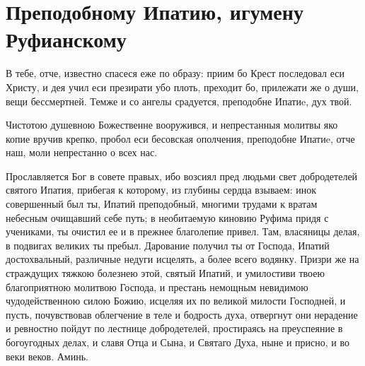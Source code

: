 \section{Преподобному Ипатию, игумену Руфианскому}\begin{mymulticols}


В тебе, отче, известно спасеся еже по образу: приим бо Крест последовал еси Христу, и дея учил еси презирати убо плоть, преходит бо, прилежати же о души, вещи бессмертней. Темже и со ангелы срадуется, преподобне Ипатиe, дух твой.


Чистотою душевною Божественне вооружився, и непрестанныя молитвы яко копие вручив крепко, пробол еси бесовская ополчения, преподобне Ипатиe, отче наш, моли непрестанно о всех нас.


Прославляется Бог в совете правых, ибо возсиял пред людьми свет добродетелей святого Ипатия, прибегая к которому, из глубины сердца взываем: инок совершенный был ты, Ипатий преподобный, многими трудами к вратам небесным очищавший себе путь; в необитаемую киновию Руфима придя с учениками, ты очистил ее и в прежнее благолепие привел. Там, власяницы делая, в подвигах великих ты пребыл. Дарование получил ты от Господа, Ипатий достохвальный, различные недуги исцелять, а более всего водянку. Призри же на страждущих тяжкою болезнею этой, святый Ипатий, и умилостиви твоею благоприятною молитвою Господа, и престань немощным невидимою чудодейственною силою Божию, исцеляя их по великой милости Господней, и пусть, почувствовав облегчение в теле и бодрость духа, отвергнут они нерадение и ревностно пойдут по лестнице добродетелей, простираясь на преуспеяние в богоугодных делах, и славя Отца и Сына, и Святаго Духа, ныне и присно, и во веки веков. Аминь.

\end{mymulticols}

\mychapterending


